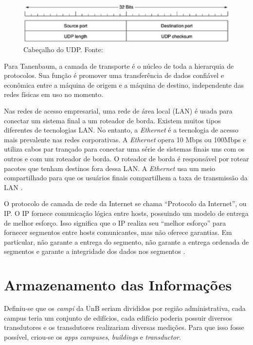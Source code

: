     \begin{figure}[!htpb]
        \centering
        \includegraphics[keepaspectratio=true,scale=0.8]{figuras/udp_header.eps}
        \caption{Cabeçalho do UDP. Fonte: \cite{tanenbaum_2002}}
        \label{udp_header}
    \end{figure}

    Para Tanenbaum, a camada de transporte é o núcleo de toda a hierarquia de protocolos. Sua função é promover uma transferência de dados confiável e econômica entre a máquina de origem e a máquina de destino, independente das redes físicas em uso no momento.

    Nas redes de acesso empresarial, uma rede de área local (LAN) é usada para conectar um sistema final a um roteador de borda. Existem muitos tipos diferentes de tecnologias LAN. No entanto, a \textit{Ethernet} é a tecnologia de acesso mais prevalente nas redes corporativas. A \textit{Ethernet} opera 10 Mbps ou 100Mbps e utiliza cabos par trançado para conectar uma série de sistemas finais uns com os outros e com um roteador de borda. O roteador de borda é responsável por rotear pacotes que tenham destinos fora dessa LAN. A \textit{Ethernet} usa um meio compartilhado para que os usuários finais compartilhem a taxa de transmissão da LAN \cite{kurose_2002}.

    O protocolo de camada de rede da Internet se chama ``Protocolo da Internet'', ou IP. O IP fornece comunicação lógica entre hosts, possuindo um modelo de entrega de melhor esforço. Isso significa que o IP realiza seu ``melhor esforço'' para fornecer segmentos entre hosts comunicantes, mas não oferece garantias. Em particular, não garante a entrega do segmento, não garante a entrega ordenada de segmentos e garante a integridade dos dados nos segmentos \cite{kurose_2002}.

\section{Armazenamento das Informações}
Definiu-se que os \textit{campi} da UnB seriam divididos por região administrativa, cada campus teria um conjunto de edifícios, cada edifício poderia possuir diversos transdutores e os transdutores realizariam diversas medições. Para que isso fosse possível, criou-se os \textit{apps} \textit{campuses}, \textit{buildings} e \textit{transductor}.

